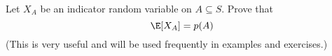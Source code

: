 Let $X_A$ be an indicator random variable
on $A \subseteq S$.
Prove that 
\[
  \E[X_A] = p(A)
\]
(This is very useful and will be used frequently in examples and exercises.)
